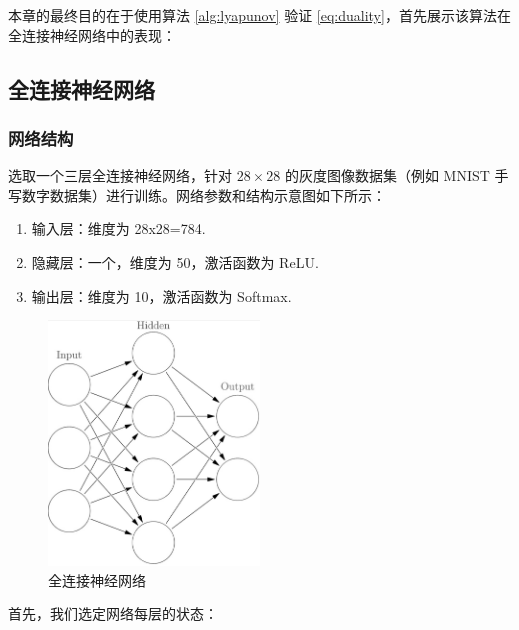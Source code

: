 本章的最终目的在于使用算法 \ref{alg:lyapunov} 验证 \ref{eq:duality}，首先展示该算法在全连接神经网络中的表现：

\subsection{全连接神经网络}

\subsubsection{网络结构}

选取一个三层全连接神经网络，针对 $28\times 28$ 的灰度图像数据集（例如 MNIST 手写数字数据集）进行训练。网络参数和结构示意图如下所示：

\begin{enumerate}
  \item 输入层：维度为 28x28=784.
  \item 隐藏层：一个，维度为 50，激活函数为 ReLU.
  \item 输出层：维度为 10，激活函数为 Softmax.
\end{enumerate}

\begin{figure}[htbp]
  \centering
  \includegraphics[width=0.5\textwidth]{figures/nn.jpeg}
  \caption{全连接神经网络}
  \label{fig:example}
\end{figure}

首先，我们选定网络每层的状态：

